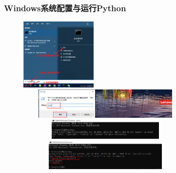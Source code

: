 \begin{frame}
	\frametitle{\textrm{Windows}系统配置与运行\textrm{Python}}
\begin{figure}[h!]
\vspace*{-0.15in}
\centering
\includegraphics[height=1.4in, width=1.5in, viewport=0 0 724 627,clip]{Figures/python_config-windows-6.png}\\
\includegraphics[height=0.6in, width=3.5in, viewport=0 0 1484 312,clip]{Figures/python_command-windows-1.png}
\includegraphics[height=0.4in, width=3.5in, viewport=0 0 1496 261,clip]{Figures/python_command-windows-2.png}
\includegraphics[height=0.6in, width=3.5in, viewport=0 0 1559 387,clip]{Figures/python_command-windows-3.png}
\label{Python-run_windows}
\end{figure}
\end{frame}

